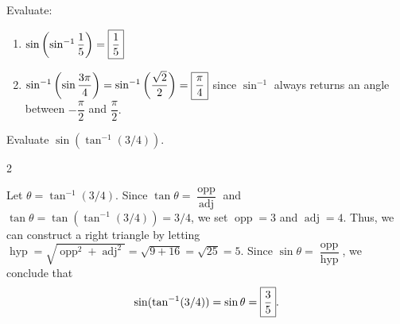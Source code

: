 \documentclass{book}
\DeclareMathOperator{\hyp}{hyp}
\DeclareMathOperator{\opp}{opp}
\DeclareMathOperator{\adj}{adj}
\begin{document}
\begin{Exam} Evaluate:
\begin{enumerate}
\item $\sin\left(\sin^{-1}\dfrac{1}{5}\right) = \fbox{$\dfrac{1}{5}$}$\\
\item $\sin^{-1}\left(\sin \dfrac{3\pi}{4}\right) =  \sin^{-1}\left(\dfrac{\sqrt{2}}{2}\right)  = \fbox{$\dfrac{\pi}{4}$}$ since $\sin^{-1}$ always returns an angle between $-\dfrac{\pi}{2}$ and $\dfrac{\pi}{2}.$ 
\end{enumerate}
\end{Exam}\vs

\begin{Exam} Evaluate $\sin(\tan^{-1}(3/4))$.
\begin{multicols}{2}
\begin{center}
\end{center}\columnbreak

Let $\theta = \tan^{-1}(3/4)$. Since $\tan \theta = \dfrac{\opp}{\adj}$ and $\tan \theta = \tan (\tan^{-1}(3/4)) = 3/4$, we set $\opp = 3$ and $\adj = 4$. Thus, we can construct a right triangle by letting $\hyp = \sqrt{\opp^2 + \adj^2} = \sqrt{9+16} = \sqrt{25} = 5$. Since $\sin\theta = \dfrac{\opp}{\hyp}$, we conclude that \[\sin(\tan^{-1}(3/4)) = \sin \theta = \fbox{$\dfrac{3}{5}$}. \]
\end{multicols}
\end{Exam}\vs
\end{document}
